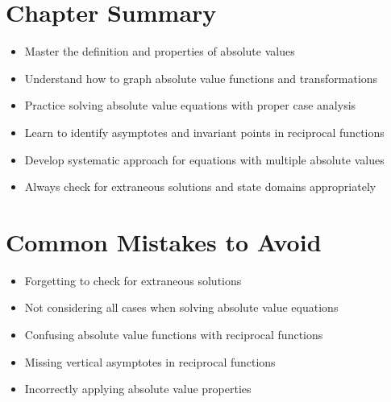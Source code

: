 \documentclass[12pt]{article}
\begin{document}
\section*{Chapter Summary}
\begin{tcolorbox}[colback=lightgray,colframe=primary,title=Key Takeaways]
    \begin{itemize}
        \item Master the definition and properties of absolute values
        \item Understand how to graph absolute value functions and transformations
        \item Practice solving absolute value equations with proper case analysis
        \item Learn to identify asymptotes and invariant points in reciprocal functions
        \item Develop systematic approach for equations with multiple absolute values
        \item Always check for extraneous solutions and state domains appropriately
    \end{itemize}
\end{tcolorbox}

\section*{Common Mistakes to Avoid}
\begin{tcolorbox}[colback=lightgray,colframe=accent,title=Watch Out For]
    \begin{itemize}
        \item Forgetting to check for extraneous solutions
        \item Not considering all cases when solving absolute value equations
        \item Confusing absolute value functions with reciprocal functions
        \item Missing vertical asymptotes in reciprocal functions
        \item Incorrectly applying absolute value properties
    \end{itemize}
\end{tcolorbox}
\end{document}
